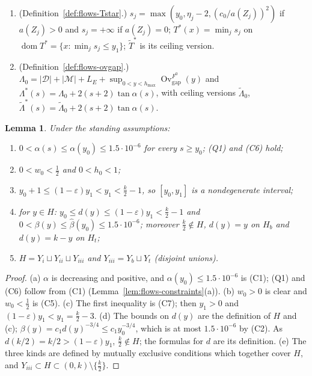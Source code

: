 \documentclass[11pt]{amsart}
\newcommand{\eps}{\varepsilon}
\newcommand{\cD}{\mathcal D}
\newcommand{\cM}{\mathcal M}
\newcommand{\cT}{\mathcal T}
\newcommand{\Ovgap}{\operatorname{Ov}_{\mathrm{gap}}}
\newcommand{\hmax}{h_{\max}}
\newcommand{\Lam}{\Lambda}
\newcommand{\Fz}{F^{0}}
\newcommand{\Tstar}{T^{*}}
\newtheorem{lemma}[theorem]{Lemma}
\theoremstyle{definition}
\theoremstyle{remark}
\numberwithin{equation}{section}
\begin{document}
\begin{enumerate}[label=(N\arabic*),leftmargin=*]
  the scale flow, with paths $\pi^s_x$; $\cT_s$ is the set of $x$ for which $\pi^s_x$ is T-terminated (equivalently,
  $T_s$-terminated), and $N(s)=|\cT_s|$. The ceiling versions carry a tilde.
\item (Definition~\ref{def:flows-Tstar}.) $s_j=\max(y_0,\eta_j-2,(c_0/a(Z_j))^2)$ if $a(Z_j)>0$ and $s_j=+\infty$ if
  $a(Z_j)=0$; $\Tstar(x)=\min_js_j$ on $\operatorname{dom}\Tstar=\{x:\min_js_j\le y_1\}$; $\tilde T^*$ is its ceiling
  version.
\item (Definition~\ref{def:flows-ovgap}.)
  $\Lam_0=|\cD|+|\cM|+L_E+\sup_{0<y<\hmax}\Ovgap^{\Fz}(y)$ and $\Lam^*(s)=\Lam_0+2(s+2)\tan\alpha(s)$, with ceiling
  versions $\tilde\Lam_0$, $\tilde\Lam^*(s)=\tilde\Lam_0+2(s+2)\tan\alpha(s)$.
\end{enumerate}

\begin{lemma}\label{lem:P8-cons}
Under the standing assumptions:
\begin{enumerate}[label=(\alph*)]
\item $0<\alpha(s)\le\alpha(y_0)\le1.5\cdot10^{-6}$ for every $s\ge y_0$; \textup{(Q1)} and \textup{(C6)} hold;
\item $0<w_0<\frac12$ and $0<h_0<1$;
\item $y_0+1\le(1-\eps)y_1<y_1<\frac k2-1$, so $[y_0,y_1]$ is a nondegenerate interval;
\item for $y\in H$: $y_0\le d(y)\le(1-\eps)y_1<\frac k2-1$ and $0<\beta(y)\le\hat\beta(y_0)\le1.5\cdot10^{-6}$;
  moreover $\frac k2\notin H$, $d(y)=y$ on $H_b$ and $d(y)=k-y$ on $H_t$;
\item $H=Y_i\sqcup Y_{ii}\sqcup Y_{iii}$ and $Y_{iii}=Y_b\sqcup Y_t$ \textup{(}disjoint unions\textup{)}.
\end{enumerate}
\end{lemma}

\begin{proof}
(a) $\alpha$ is decreasing and positive, and $\alpha(y_0)\le1.5\cdot10^{-6}$ is (C1); (Q1) and (C6) follow from (C1)
(Lemma~\ref{lem:flows-constraints}(a)).
(b) $w_0>0$ is clear and $w_0<\frac12$ is (C5).
(c) The first inequality is (C7); then $y_1>0$ and $(1-\eps)y_1<y_1=\frac k2-3$.
(d) The bounds on $d(y)$ are the definition of $H$ and (c); $\beta(y)=c_1d(y)^{-3/4}\le c_1y_0^{-3/4}$, which is at
most $1.5\cdot10^{-6}$ by (C2). As $d(k/2)=k/2>(1-\eps)y_1$, $\frac k2\notin H$; the formulas for $d$ are its
definition.
(e) The three kinds are defined by mutually exclusive conditions which together cover $H$, and
$Y_{iii}\subset H\subset(0,k)\setminus\{\frac k2\}$.
\end{proof}
\end{document}
